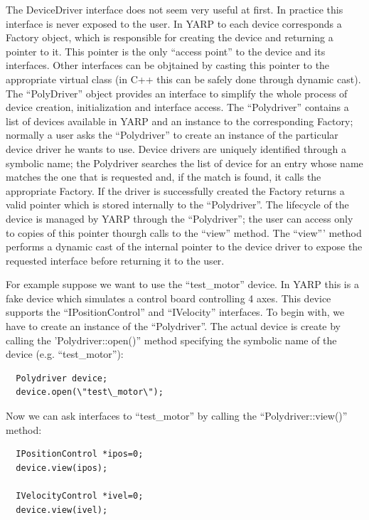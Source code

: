 The DeviceDriver interface does not seem very useful at first. In practice this 
interface is never exposed to the user. In YARP to each device corresponds a 
Factory object, which is responsible for creating the device and returning a 
pointer to it. This pointer is the only ``access point'' to the device and 
its interfaces. Other interfaces can be objtained by casting this pointer to the 
appropriate virtual class (in C++ this can be safely done through dynamic cast). 
The ``PolyDriver'' object 
provides an interface to simplify the whole process of device creation, 
initialization and interface access. The ``Polydriver'' contains a list of devices 
available in YARP and an instance to the corresponding Factory; normally a
user asks the ``Polydriver'' to create an instance of the particular device driver
he wants to use. Device drivers are uniquely identified through a symbolic name; 
the Polydriver searches the list of device for an entry whose name matches the 
one that is requested and, if the match is found, it calls the appropriate 
Factory. If the driver is successfully created the Factory returns a valid pointer 
which is stored internally to the ``Polydriver''. The lifecycle of the device is
managed by YARP through the ``Polydriver''; the user can access only to copies of this
pointer thourgh calls to the ``view'' method. The ``view''' method performs 
a dynamic cast of the internal pointer to the device driver to expose the requested
interface before returning it to the user.

For example suppose we want to use the ``test\_motor'' device. In YARP this 
is a fake device which simulates a control board controlling 4 axes. This device 
supports the ``IPositionControl'' and ``IVelocity'' interfaces. To begin with, we have 
to create an instance of the ``Polydriver''. The actual device is create 
by calling the 'Polydriver::open()'' method specifying the symbolic name of the device 
(e.g. ``test\_motor''):

\begin{verbatim}
  Polydriver device;
  device.open(\"test\_motor\");
\end{verbatim}

Now we can ask interfaces to ``test\_motor'' by calling the 
``Polydriver::view()'' method:

\begin{verbatim}
  IPositionControl *ipos=0;
  device.view(ipos);

  IVelocityControl *ivel=0;
  device.view(ivel);
\end{verbatim}

